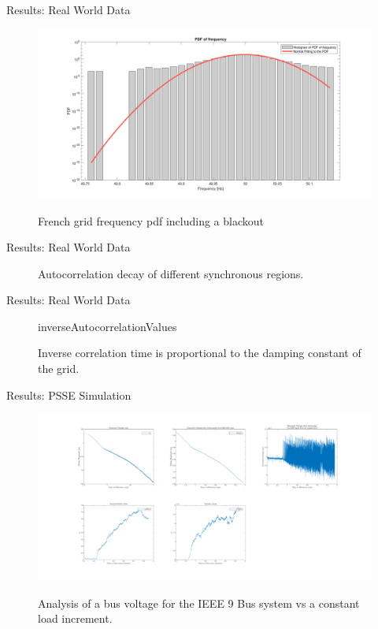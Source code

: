 \begin{frame}{Results: Real World Data}
	\begin{figure}
		\centering
		\includegraphics[scale=0.15]{../figures/pdf/pdf_frequency_rte_2021_01_blackout}
		\label{fig:pdf_rte2021blackout}
		\caption{French grid frequency pdf including a blackout}
	\end{figure}
\end{frame}

\begin{frame}{Results: Real World Data}	
	\begin{figure}[ht]
		\centering
		\caption{Autocorrelation decay of different synchronous regions.}
		\label{fig:comp5}
	\end{figure}
\end{frame}

\begin{frame}{Results: Real World Data}
	\begin{figure}
		\centering
		{inverseAutocorrelationValues}
		\label{tab:invAutocorr}
		\caption{Inverse correlation time is proportional to the damping constant of the grid.}
	\end{figure}	
\end{frame}

\begin{frame}{Results: PSSE Simulation}
	\begin{figure}
		\centering
		\includegraphics[scale=0.20]{../figures/pdf/_ieee9busVoltages_9_T_3_sec.pdf}
		\label{fig:pdf_9bussystem}
		\caption{Analysis of a bus voltage for the IEEE 9 Bus system vs a constant load increment.}
	\end{figure}
\end{frame}
